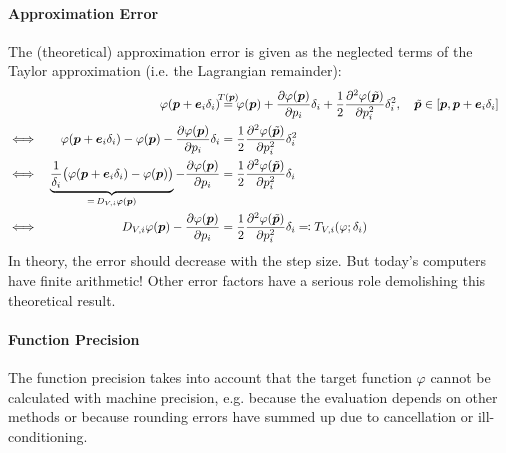 				\paragraph{Approximation Error}
					The (theoretical) approximation error is given as the neglected terms of the Taylor approximation (i.e. the Lagrangian remainder):
					\begin{align*}
						     &  & \varphi(\vec{p} + \vec{e}_i \delta_i)                                                                                                                             & \overset{\mathclap{\,T(\vec{p})\,}}{=} \varphi(\vec{p}) + \pdv{\varphi(\vec{p})}{p_i} \delta_i + \frac{1}{2} \pdv[2]{\varphi(\tilde{\vec{p}})}{p_i} \delta_i^2,\quad \tilde{\vec{p}} \in [\vec{p}, \vec{p} + \vec{e}_i \delta_i] & \\
						\iff &  & \varphi(\vec{p} + \vec{e}_i \delta_i) - \varphi(\vec{p}) - \pdv{\varphi(\vec{p})}{p_i} \delta_i                                                                   & = \frac{1}{2} \pdv[2]{\varphi(\tilde{\vec{p}})}{p_i} \delta_i^2                                                                                                                                                                  & \\
						\iff &  & \underbrace{\frac{1}{\delta_i} \big( \varphi(\vec{p} + \vec{e}_i \delta_i) - \varphi(\vec{p}) \big)}_{=\, D_{V, i}\varphi(\vec{p})} - \pdv{\varphi(\vec{p})}{p_i} & = \frac{1}{2} \pdv[2]{\varphi(\tilde{\vec{p}})}{p_i} \delta_i                                                                                                                                                                    & \\
						\iff &  & D_{V, i}\varphi(\vec{p}) - \pdv{\varphi(\vec{p})}{p_i}                                                                                                            & = \frac{1}{2} \pdv[2]{\varphi(\tilde{\vec{p}})}{p_i} \delta_i \eqqcolon T_{V, i}(\varphi; \delta_i)                                                                                                                              &
					\end{align*}
					In theory, the error should decrease with the step size. But today's computers have finite arithmetic! Other error factors have a serious role demolishing this theoretical result.

				\paragraph{Function Precision}
					The function precision takes into account that the target function \( \varphi \) cannot be calculated with machine precision, e.g. because the evaluation depends on other methods or because rounding errors have summed up due to cancellation or ill-conditioning.

